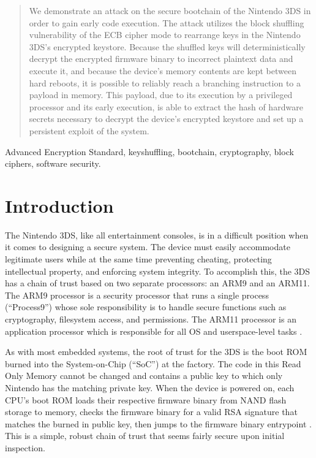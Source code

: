 \documentclass[journal]{IEEEtran}
\begin{document}
\begin{abstract}
We demonstrate an attack on the secure bootchain of the Nintendo 3DS in order to
gain early code execution. The attack utilizes the block shuffling vulnerability
of the ECB cipher mode to rearrange keys in the Nintendo 3DS's encrypted
keystore. Because the shuffled keys will deterministically decrypt the encrypted
firmware binary to incorrect plaintext data and execute it, and because the
device's memory contents are kept between hard reboots, it is possible to
reliably reach a branching instruction to a payload in memory. This payload, due
to its execution by a privileged processor and its early execution, is able to
extract the hash of hardware secrets necessary to decrypt the device's encrypted
keystore and set up a persistent exploit of the system.
\end{abstract}

\begin{IEEEkeywords}
Advanced Encryption Standard, keyshuffling, bootchain, cryptography, block
ciphers, software security.
\end{IEEEkeywords}

\section{Introduction}

The Nintendo 3DS, like all entertainment consoles, is in a difficult position
when it comes to designing a secure system. The device must easily accommodate
legitimate users while at the same time preventing cheating, protecting
intellectual property, and enforcing system integrity. To accomplish this, the
3DS has a chain of trust based on two separate processors: an ARM9 and an ARM11.
The ARM9 processor is a security processor that runs a single process
(``Process9'') whose sole responsibility is to handle secure functions such as
cryptography, filesystem access, and permissions. The ARM11 processor is an
application processor which is responsible for all OS and userspace-level
tasks \cite{cryptosystem}.

As with most embedded systems, the root of trust for the 3DS is the boot ROM
burned into the System-on-Chip (``SoC'') at the factory. The code in this Read
Only Memory cannot be changed and contains a public key to which only Nintendo
has the matching private key. When the device is powered on, each CPU's boot ROM
loads their respective firmware binary from NAND flash storage to memory, checks
the firmware binary for a valid RSA signature that matches the burned in public
key, then jumps to the firmware binary entrypoint \cite{cryptosystem}. This is a
simple, robust chain of trust that seems fairly secure upon initial inspection.
\end{document}
